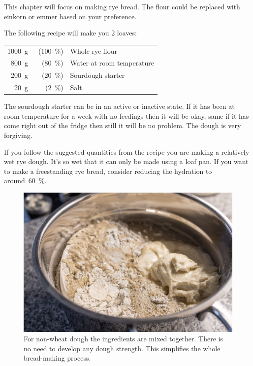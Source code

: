 This chapter will focus on making rye bread. The flour could
be replaced with einkorn or emmer based on your preference.

The following recipe will make you 2 loaves:

\begin{tabular}{r@{}rl@{}}
    \qty{1000}{\gram} &~(\qty{100}{\percent}) & Whole rye flour\\
    \qty{800}{\gram}  &  (\qty{80}{\percent}) & Water at room temperature\\
    \qty{200}{\gram}  &  (\qty{20}{\percent}) & Sourdough starter\\
    \qty{20}{\gram}   &   (\qty{2}{\percent}) & Salt\\
\end{tabular}

The sourdough starter can be in an active or inactive state. If it has been
at room temperature for a week with no feedings then it will be okay, same
if it has come right out of the fridge then still it will be no problem.
The dough is very forgiving.

If you follow the suggested quantities from the recipe you are making a
relatively wet rye dough. It's so wet that it can only be made using a loaf
pan. If you want to make a freestanding rye bread, consider reducing the
hydration to around~\qty{60}{\percent}.

\begin{figure}[!htb]
  \includegraphics[width=\textwidth]{ingredients}
  \caption[Non-wheat dough]{For non-wheat dough the ingredients are mixed
      together. There is no need to develop any dough strength. This
      simplifies the whole bread-making process.}%
  \label{fig:non-wheat-ingredients}
\end{figure}


